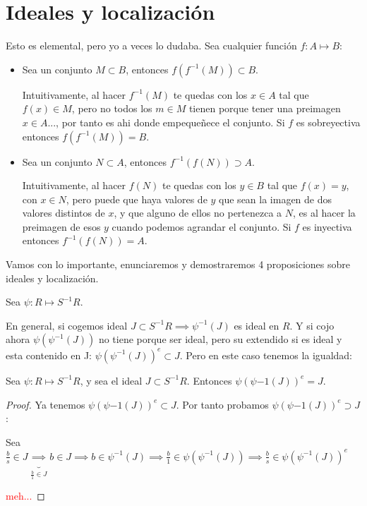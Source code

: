 \section{Ideales y localización}

\nota Esto es elemental, pero yo a veces lo dudaba. Sea cualquier función $f: A \longmapsto B$:
\begin{itemize}
	\item Sea un conjunto $M \subset B$, entonces $f(f^{-1}(M)) \subset B$. 
	
	Intuitivamente, al hacer $f^{-1}(M)$ te quedas con los $x \in A$ tal que $f(x) \in M$, pero no todos los $m \in M$ tienen porque tener una preimagen $x \in A$..., por tanto es ahi donde empequeñece el conjunto. Si $f$ es sobreyectiva entonces $f(f^{-1}(M))= B$.
	\item Sea un conjunto $N \subset A$, entonces $f^{-1}(f(N)) \supset A$.
	
	Intuitivamente, al hacer $f(N)$ te quedas con los $y \in B$ tal que $f(x)=y$, con $x\in N$, pero puede que haya valores de $y$ que sean la imagen de dos valores distintos de $x$, y que alguno de ellos no pertenezca a $N$, es al hacer la preimagen de esos $y$ cuando podemos agrandar el conjunto. Si $f$ es inyectiva entonces $f^{-1}(f(N)) =  A$.
\end{itemize}

Vamos con lo importante, enunciaremos y demostraremos 4 proposiciones sobre ideales y localización.

Sea $\psi:R \longmapsto S^{-1}R$. 

En general, si cogemos ideal $J \subset S^{-1}R \implies \psi^{-1}(J)$ es ideal en $R$.  Y si cojo ahora $\psi(\psi^{-1}(J))$ no tiene porque ser ideal, pero su extendido si es ideal y esta contenido en J: $\psi(\psi^{-1}(J))^e \subset J$. Pero en este caso tenemos la igualdad:

\begin{prop}
	Sea $\psi:R \longmapsto S^{-1}R$, y sea el ideal $J \subset S^{-1}R$.  Entonces $\psi(\psi{-1}(J))^e = J$.
\end{prop}

\begin{proof}
	Ya tenemos $\psi(\psi{-1}(J))^e \subset J$. Por tanto probamos $\psi(\psi{-1}(J))^e \supset J$:
	
	Sea $\frac{b}{s} \in J \underbrace{\implies}_{\frac{b}{1}\in J} b \in J \implies b \in \psi^{-1}(J) \implies \frac{b}{1} \in \psi(\psi^{-1}(J)) \implies \frac{b}{s} \in \psi(\psi^{-1}(J))^e$
	
	\textcolor{red}{meh...}
\end{proof}


